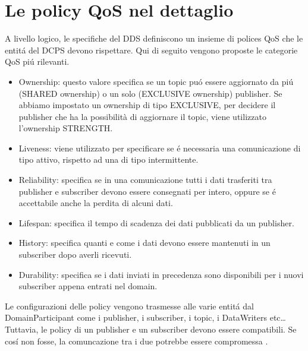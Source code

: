 \section{Le policy QoS nel dettaglio}
A livello logico, le specifiche del DDS
definiscono un insieme di polices QoS
che le entitá del DCPS devono rispettare. Qui di seguito vengono
proposte le categorie QoS piú rilevanti.
\begin{itemize}
    \item Ownership: questo valore specifica se un topic
    puó essere aggiornato da piú 
    (SHARED ownership) o un solo (EXCLUSIVE ownership) publisher.
    Se abbiamo impostato un ownership di tipo EXCLUSIVE, per decidere il 
    publisher che ha la possibilità di aggiornare il topic, viene 
    utilizzato l'ownership STRENGTH.
    \item Liveness: viene utilizzato per specificare se é necessaria
    una comunicazione di tipo attivo, rispetto ad una di tipo 
    intermittente.
    \item Reliability: specifica se in una comunicazione tutti i dati
    trasferiti tra publisher e subscriber devono essere consegnati
    per intero, oppure
    se é accettabile anche la perdita di alcuni dati.
    \item Lifespan: specifica il tempo di scadenza dei dati pubblicati da 
    un publisher.
    \item History: specifica quanti e come i dati devono essere 
    mantenuti in un 
    subscriber dopo averli ricevuti.
    \item Durability: specifica se i dati inviati in precedenza sono
    disponibili per i nuovi subscriber appena entrati nel domain.
\end{itemize}
Le configurazioni 
delle policy vengono trasmesse alle varie entitá dal DomainParticipant
come i publisher, i subscriber, i topic, i DataWriters etc\dots
Tuttavia, le policy di un publisher e un subscriber devono essere compatibili.
Se cosí non fosse, la comuncazione tra i due potrebbe essere compromessa
\cite{Michaud2017Apr}.


